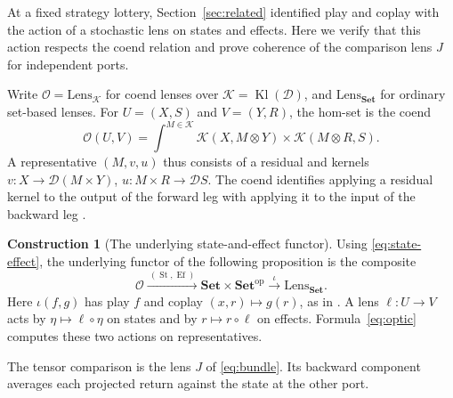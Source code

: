 \documentclass[11pt,a4paper]{article}
\theoremstyle{definition}
\newtheorem*{construction}{Construction}
\newcommand{\D}{\mathcal D}
\newcommand{\Kl}{\operatorname{Kl}}
\newcommand{\Set}{\mathbf{Set}}
\newcommand{\Opt}{\mathcal O}
\newcommand{\St}{\operatorname{St}}
\newcommand{\Ef}{\operatorname{Ef}}
\begin{document}
At a fixed strategy lottery, Section~\ref{sec:related} identified play and coplay with the action of a stochastic lens on states and effects. Here we verify that this action respects the coend relation and prove coherence of the comparison lens $J$ for independent ports.

Write $\Opt=\mathrm{Lens}_{\mathcal K}$ for coend lenses over $\mathcal K=\Kl(\D)$, and $\mathrm{Lens}_{\Set}$ for ordinary set-based lenses. For $U=(X,S)$ and $V=(Y,R)$, the hom-set is the coend
\[
    \Opt(U,V)=\int^{M\in\mathcal K}
    \mathcal K(X,M\otimes Y)\times\mathcal K(M\otimes R,S).
\]
A representative $(M,v,u)$ thus consists of a residual and kernels $v:X\to\D(M\times Y)$, $u:M\times R\to\D S$. The coend identifies applying a residual kernel to the output of the forward leg with applying it to the input of the backward leg \cite[Definition~3.3.1]{bolt}.

\begin{construction}[The underlying state-and-effect functor]
    Using \eqref{eq:state-effect}, the underlying functor of the following proposition is the composite
    \[
        \Opt\xrightarrow{\ (\St,\Ef)\ }\Set\times\Set^{\mathrm{op}}
        \xrightarrow{\ \iota\ }\mathrm{Lens}_{\Set}.
    \]
    Here $\iota(f,g)$ has play $f$ and coplay $(x,r)\mapsto g(r)$, as in \cite[Section~5]{gklf}. A lens $\ell:U\to V$ acts by $\eta\mapsto\ell\circ\eta$ on states and by $r\mapsto r\circ\ell$ on effects. Formula~\eqref{eq:optic} computes these two actions on representatives.

    The tensor comparison is the lens $J$ of \eqref{eq:bundle}. Its backward component averages each projected return against the state at the other port.
\end{construction}
\end{document}
